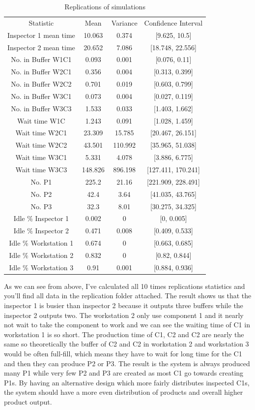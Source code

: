 \documentclass{article}
\begin{document}
\begin{table}[htp]
\caption{Replications of simulations}
\begin{center}
\begin{tabular}{cccc}
\hline
Statistic & Mean & Variance & Confidence Interval\\
Inspector 1 mean time&10.063&0.374&[9.625, 10.5]\\
Inspector 2 mean time&20.652&7.086&[18.748, 22.556]\\
No. in Buffer W1C1&0.093&0.001&[0.076, 0.11]\\
No. in Buffer W2C1&0.356&0.004&[0.313, 0.399]\\
No. in Buffer W2C2&0.701&0.019&[0.603, 0.799]\\
No. in Buffer W3C1&0.073&0.004&[0.027, 0.119]\\
No. in Buffer W3C3&1.533&0.033&[1.403, 1.662]\\
Wait time W1C&1.243&0.091&[1.028, 1.459]\\
Wait time W2C1&23.309&15.785&[20.467, 26.151]\\
Wait time W2C2&43.501&110.992&[35.965, 51.038]\\
Wait time W3C1&5.331&4.078&[3.886, 6.775]\\
Wait time W3C3&148.826&896.198&[127.411, 170.241]\\
No. P1&225.2&21.16&[221.909, 228.491]\\
No. P2&42.4&3.64&[41.035, 43.765]\\
No. P3&32.3&8.01&[30.275, 34.325]\\
Idle \% Inspector 1&0.002&0&[0, 0.005]\\
Idle \% Inspector 2&0.471&0.008&[0.409, 0.533]\\
Idle \% Workstation 1&0.674&0&[0.663, 0.685]\\
Idle \% Workstation 2&0.832&0&[0.82, 0.844]\\
Idle \% Workstation 3&0.91&0.001&[0.884, 0.936]\\
\hline

\end{tabular}
\end{center}
\label{default}
\end{table}%

As we can see from above, I've calculated all 10 times replications statistics and you'll find all data in the replication folder attached. The result shows us that the inspector 1 is busier than inspector 2 because it outputs three buffers while the inspector 2 outputs two. The workstation 2 only use component 1 and it nearly not wait to take the component to work and we can see the waiting time of C1 in workstation 1 is so short. The production time of C1, C2 and C2 are nearly the same so theoretically the buffer of C2 and C2 in workstation 2 and workstation 3 would be often full-fill, which means they have to wait for long time for the C1 and then they can produce P2 or P3. The result is the system is always produced many P1 while very few P2 and P3 are created as most C1 go towards creating P1s. By having an alternative design which more fairly distributes inspected C1s, the system should have a more even distribution of products and overall higher product output.
\end{document}
